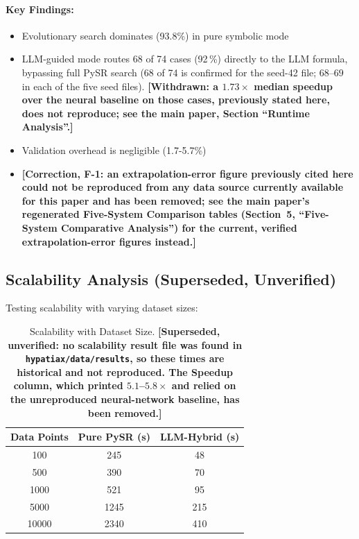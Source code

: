 \documentclass[twoside,11pt]{article}
\begin{document}
\paragraph{Key Findings:}
\begin{itemize}
\item Evolutionary search dominates (93.8\%) in pure symbolic mode
\item LLM-guided mode routes 68 of 74 cases (92\,\%) directly to the LLM formula, bypassing full PySR search (68 of 74 is confirmed for the seed-42 file; $68$--$69$ in each of the five seed files). \textbf{[Withdrawn: a $1.73\times$ median speedup over the neural baseline on those cases, previously stated here, does not reproduce; see the main paper, Section ``Runtime Analysis''.]}
\item Validation overhead is negligible (1.7-5.7\%)
\item \textbf{[Correction, F-1: an extrapolation-error figure previously cited here could not be reproduced from any data source currently available for this paper and has been removed; see the main paper's regenerated Five-System Comparison tables (Section~5, ``Five-System Comparative Analysis'') for the current, verified extrapolation-error figures instead.]}
\end{itemize}

\subsection{Scalability Analysis (Superseded, Unverified)}

Testing scalability with varying dataset sizes:

\begin{table}[H]
\centering
\caption{Scalability with Dataset Size.
  \textbf{[Superseded, unverified: no scalability result file was found in
  \texttt{hypatiax/data/results}, so these times are historical and not reproduced.
  The Speedup column, which printed $5.1$--$5.8\times$ and relied on the unreproduced
  neural-network baseline, has been removed.]}}
\label{tab:scalability}
\begin{tabular}{@{}ccc@{}}
\toprule
\textbf{Data Points} & \textbf{Pure PySR (s)} & \textbf{LLM-Hybrid (s)} \\
\midrule
100 & 245 & 48 \\
500 & 390 & 70 \\
1000 & 521 & 95 \\
5000 & 1245 & 215 \\
10000 & 2340 & 410 \\
\bottomrule
\end{tabular}
\end{table}
\end{document}
